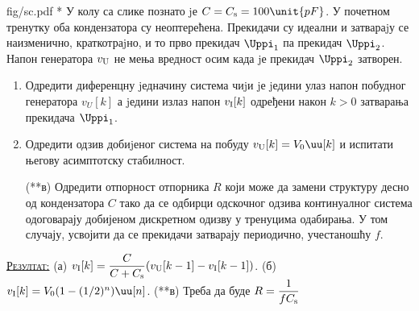\begin{slikaDesno}{fig/sc.pdf}
    {\color{red}*}\PID
    У колу са слике познато jе $C = C_{\rm s} = 100\unit{pF}$. 
    У почетном тренутку оба кондензатора су неоптерећена.
Прекидачи су идеални и затвараjу се наизменично,
краткотраjно, и то прво прекидач $\Uppi_1$ па прекидач
$\Uppi_2$. Напон генератора $v_{\rm U}$ не мења вредност осим када
jе прекидач $\Uppi_2$ затворен.
\end{slikaDesno}
\begin{enumerate}[label=(\alph*)]
    \item Одредити диференцну jедначину система чиjи jе
    jедини улаз напон побудног генератора $v_U[k]$ а jедини излаз напон 
    $v_{\rm I}[k]$ одређени након $k > 0$ затварања прекидача $\Uppi_1$.
    \item Одредити одзив добиjеног система на побуду $v_{\rm U}[k] = V_0 \uu[k]$ и 
    испитати његову асимптотску стабилност.
    \item[({\color{red}**}в)] Одредити отпорност отпорника $R$ који може да замени 
    структуру десно од кондензатора $C$ тако да се одбирци одскочног 
    одзива континуалног система одоговарају добијеном дискретном одизву у тренуцима 
    одабирања. У том случају, усвојити да се прекидачи затварају периодично, 
    учестаношћу $f$.
\end{enumerate}
\vspace*{2mm}

\textsc{\underline{Резултат:}}
(а) $v_{\rm I}[k] = \dfrac{C}{C + C_{\rm s}}( v_{\rm U}[k-1] - v_{\rm I}[k-1] )$.
(б) $v_{\rm I}[k] = V_0( 1 - (1/2)^n ) \uu[n]$. 
({\color{red}**}в) Треба да буде $R = \dfrac{1}{fC_{\rm s}}$
